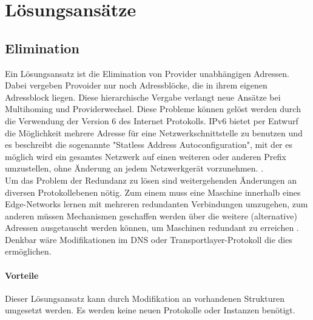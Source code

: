 \section{Lösungsansätze}
\subsection{Elimination}
Ein Lösungsansatz ist die Elimination von Provider unabhängigen Adressen. Dabei vergeben Provoider nur noch Adressblöcke, die in ihrem eigenen Adressblock liegen. Diese hierarchische Vergabe verlangt neue Ansätze bei Multihoming und Providerwechsel. Diese Probleme können gelöst werden durch die Verwendung der Version 6 des Internet Protokolls. IPv6 bietet per Entwurf die Möglichkeit mehrere Adresse für eine Netzwerkschnittstelle zu benutzen und es beschreibt die sogenannte "Statless Address Autoconfiguration", mit der es möglich wird ein gesamtes Netzwerk auf einen weiteren oder anderen Prefix umzustellen, ohne Änderung an jedem Netzwerkgerät vorzunehmen. \cite{RFC4862}. \\ Um das Problem der Redundanz zu lösen sind  weitergehenden Änderungen an diversen Protokollebenen nötig. Zum einem muss eine Maschine innerhalb eines Edge-Networks lernen mit mehreren redundanten Verbindungen umzugehen, zum anderen müssen Mechanismen geschaffen werden über die weitere (alternative) Adressen ausgetauscht werden können, um Maschinen redundant zu erreichen \cite{jen:2008:start}. Denkbar wäre Modifikationen im DNS oder Transportlayer-Protokoll die dies ermöglichen.
\paragraph{Vorteile}
Dieser Lösungsansatz kann durch Modifikation an vorhandenen Strukturen umgesetzt werden. Es werden keine neuen Protokolle oder Instanzen benötigt.
